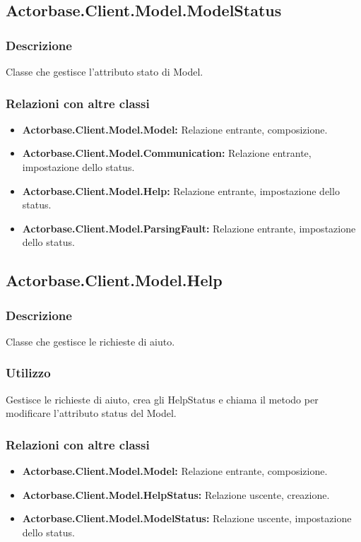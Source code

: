 \documentclass[a4paper]{article}
\begin{document}
		\subsection{Actorbase.Client.Model.ModelStatus}
			\subsubsection{Descrizione}
				Classe che gestisce l'attributo stato di Model.
			\subsubsection{Relazioni con altre classi}
				\begin{itemize}
					\item \textbf{Actorbase.Client.Model.Model:} Relazione entrante, composizione.
					\item \textbf{Actorbase.Client.Model.Communication:} Relazione entrante, impostazione dello status.
					\item \textbf{Actorbase.Client.Model.Help:} Relazione entrante, impostazione dello status.
					\item \textbf{Actorbase.Client.Model.ParsingFault:}	Relazione entrante, impostazione dello status.
				\end{itemize}
				
		\subsection{Actorbase.Client.Model.Help}
			\subsubsection{Descrizione}
				Classe che gestisce le richieste di aiuto.
			\subsubsection{Utilizzo}
				Gestisce le richieste di aiuto, crea gli HelpStatus e chiama il metodo per modificare l'attributo status del Model.
			\subsubsection{Relazioni con altre classi}
				\begin{itemize}
					\item \textbf{Actorbase.Client.Model.Model:} Relazione entrante, composizione.
					\item \textbf{Actorbase.Client.Model.HelpStatus:} Relazione uscente, creazione.
					\item \textbf{Actorbase.Client.Model.ModelStatus:} Relazione uscente, impostazione dello status.
				\end{itemize}
				
\end{document}

